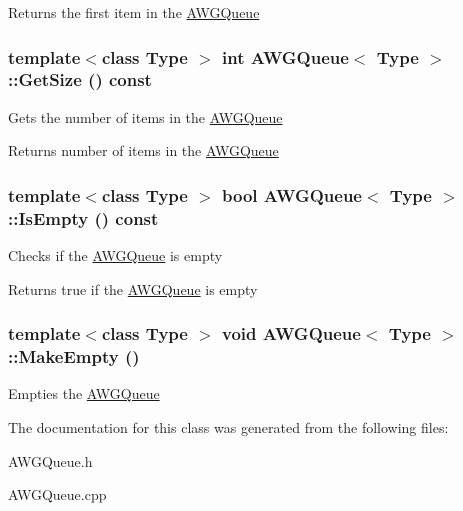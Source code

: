 \begin{DoxyReturn}{Returns}
the first item in the \hyperlink{classAWGQueue}{AWGQueue} 
\end{DoxyReturn}
\hypertarget{classAWGQueue_af86ef02bdd68c2261615d8e5af017bc7}{
\subsubsection[{GetSize}]{\setlength{\rightskip}{0pt plus 5cm}template$<$class Type $>$ int {\bf AWGQueue}$<$ Type $>$::GetSize () const}}
\label{classAWGQueue_af86ef02bdd68c2261615d8e5af017bc7}
Gets the number of items in the \hyperlink{classAWGQueue}{AWGQueue}

\begin{DoxyReturn}{Returns}
number of items in the \hyperlink{classAWGQueue}{AWGQueue} 
\end{DoxyReturn}
\hypertarget{classAWGQueue_aea641c224cf00f838f92ef9f84ef99d0}{
\subsubsection[{IsEmpty}]{\setlength{\rightskip}{0pt plus 5cm}template$<$class Type $>$ bool {\bf AWGQueue}$<$ Type $>$::IsEmpty () const}}
\label{classAWGQueue_aea641c224cf00f838f92ef9f84ef99d0}
Checks if the \hyperlink{classAWGQueue}{AWGQueue} is empty

\begin{DoxyReturn}{Returns}
true if the \hyperlink{classAWGQueue}{AWGQueue} is empty 
\end{DoxyReturn}
\hypertarget{classAWGQueue_ac080dbd149a6403e35b0eb2445fdf4c2}{
\subsubsection[{MakeEmpty}]{\setlength{\rightskip}{0pt plus 5cm}template$<$class Type $>$ void {\bf AWGQueue}$<$ Type $>$::MakeEmpty ()}}
\label{classAWGQueue_ac080dbd149a6403e35b0eb2445fdf4c2}
Empties the \hyperlink{classAWGQueue}{AWGQueue} 

The documentation for this class was generated from the following files:\begin{DoxyCompactItemize}
\item 
AWGQueue.h\item 
AWGQueue.cpp\end{DoxyCompactItemize}
